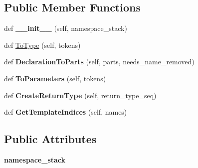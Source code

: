 \subsection*{Public Member Functions}
\begin{DoxyCompactItemize}
\item 
def {\bfseries \+\_\+\+\_\+init\+\_\+\+\_\+} (self, namespace\+\_\+stack)\hypertarget{classcpp_1_1ast_1_1TypeConverter_ae6e75773d6722cdbb96d510a49cb633a}{}\label{classcpp_1_1ast_1_1TypeConverter_ae6e75773d6722cdbb96d510a49cb633a}

\item 
def \hyperlink{classcpp_1_1ast_1_1TypeConverter_aa6ea82e40cd30e5dfcd471ff144a19cf}{To\+Type} (self, tokens)
\item 
def {\bfseries Declaration\+To\+Parts} (self, parts, needs\+\_\+name\+\_\+removed)\hypertarget{classcpp_1_1ast_1_1TypeConverter_a7c9d20d107c2bc0eb80afdf04957825f}{}\label{classcpp_1_1ast_1_1TypeConverter_a7c9d20d107c2bc0eb80afdf04957825f}

\item 
def {\bfseries To\+Parameters} (self, tokens)\hypertarget{classcpp_1_1ast_1_1TypeConverter_aeaf27fb1890f65d7216703df610b46d5}{}\label{classcpp_1_1ast_1_1TypeConverter_aeaf27fb1890f65d7216703df610b46d5}

\item 
def {\bfseries Create\+Return\+Type} (self, return\+\_\+type\+\_\+seq)\hypertarget{classcpp_1_1ast_1_1TypeConverter_a7e4d429131d9d5742ec44c78b61beb87}{}\label{classcpp_1_1ast_1_1TypeConverter_a7e4d429131d9d5742ec44c78b61beb87}

\item 
def {\bfseries Get\+Template\+Indices} (self, names)\hypertarget{classcpp_1_1ast_1_1TypeConverter_a7b5244be5a0caedd769ae866f8a182aa}{}\label{classcpp_1_1ast_1_1TypeConverter_a7b5244be5a0caedd769ae866f8a182aa}

\end{DoxyCompactItemize}
\subsection*{Public Attributes}
\begin{DoxyCompactItemize}
\item 
{\bfseries namespace\+\_\+stack}\hypertarget{classcpp_1_1ast_1_1TypeConverter_abb739f15c6cd0800e07c086c2b30833e}{}\label{classcpp_1_1ast_1_1TypeConverter_abb739f15c6cd0800e07c086c2b30833e}

\end{DoxyCompactItemize}


